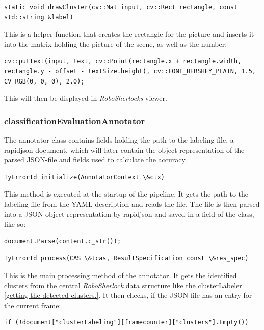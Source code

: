 \documentclass[main.tex]{subfiles}
\begin{document}
\begin{lstlisting}
static void drawCluster(cv::Mat input, cv::Rect rectangle, const std::string &label)
\end{lstlisting}

This is a helper function that creates the rectangle for the picture and inserts it into the matrix holding the picture of the scene, as well as the number:

\begin{lstlisting}
cv::putText(input, text, cv::Point(rectangle.x + rectangle.width, rectangle.y - offset - textSize.height), cv::FONT_HERSHEY_PLAIN, 1.5, CV_RGB(0, 0, 0), 2.0);
\end{lstlisting}

This will then be displayed in \textit{RoboSherlocks} viewer.



\subsubsection{classificationEvaluationAnnotator}
The annotator class contains fields holding the path to the labeling file, a rapidjson document, which will later contain the object representation of the parsed JSON-file and fields used to calculate the accuracy.

\begin{lstlisting}
TyErrorId initialize(AnnotatorContext \&ctx)
\end{lstlisting}

This method is executed at the startup of the pipeline.  It gets the path to the labeling file from the YAML description and reads the file. The file is then parsed into a JSON object representation by rapidjson and saved in a field of the class, like so:

\begin{lstlisting}
document.Parse(content.c_str());
\end{lstlisting}

\begin{lstlisting}
TyErrorId process(CAS \&tcas, ResultSpecification const \&res_spec)
\end{lstlisting}

This is the main processing method of the annotator. It gets the identified clusters from the central \textit{RoboSherlock} data structure like the clusterLabeler \ref{getting the detected clusters.}. It then checks, if the JSON-file has an entry for the current frame: 

\begin{lstlisting}
if (!document["clusterLabeling"][framecounter]["clusters"].Empty())
\end{lstlisting}
\end{document}
